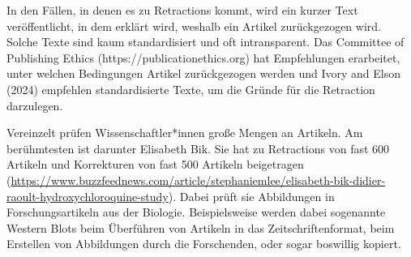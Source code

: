 \documentclass[
  letterpaper,
  DIV=11,
  numbers=noendperiod]{scrreprt}
\begin{document}
In den Fällen, in denen es zu Retractions kommt, wird ein kurzer Text
veröffentlicht, in dem erklärt wird, weshalb ein Artikel zurückgezogen
wird. Solche Texte sind kaum standardisiert und oft intransparent. Das
Committee of Publishing Ethics (https://publicationethics.org) hat
Empfehlungen erarbeitet, unter welchen Bedingungen Artikel zurückgezogen
werden und Ivory and Elson (2024) empfehlen standardisierte Texte, um
die Gründe für die Retraction darzulegen.

Vereinzelt prüfen Wissenschaftler*innen große Mengen an Artikeln. Am
berühmtesten ist darunter Elisabeth Bik. Sie hat zu Retractions von fast
600 Artikeln und Korrekturen von fast 500 Artikeln beigetragen
(\url{https://www.buzzfeednews.com/article/stephaniemlee/elisabeth-bik-didier-raoult-hydroxychloroquine-study}).
Dabei prüft sie Abbildungen in Forschungsartikeln aus der Biologie.
Beispielsweise werden dabei sogenannte Western Blots beim Überführen von
Artikeln in das Zeitschriftenformat, beim Erstellen von Abbildungen
durch die Forschenden, oder sogar boswillig kopiert.
\end{document}
